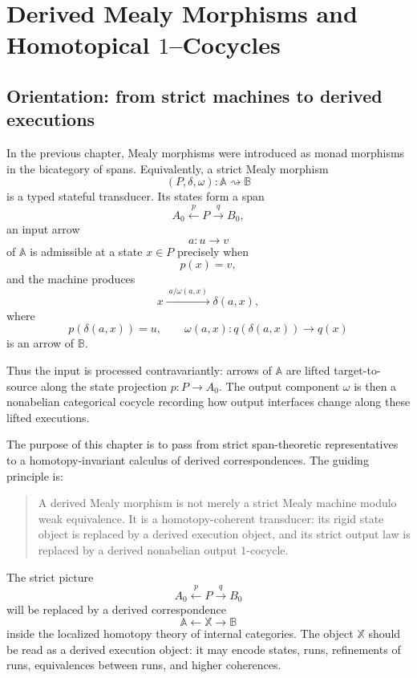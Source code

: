 \chapter{\texorpdfstring{Derived Mealy Morphisms and Homotopical $1$--Cocycles}{Derived Mealy Morphisms and Homotopical 1-Cocycles}}
\label{ch:derived-mealy-morphisms}

\section{Orientation: from strict machines to derived executions}
\label{sec:derived-mealy-orientation}

In the previous chapter, Mealy morphisms were introduced as monad
morphisms in the bicategory of spans. Equivalently, a strict Mealy
morphism
\[
(P,\delta,\omega):\mathbb A\rightsquigarrow \mathbb B
\]
is a typed stateful transducer. Its states form a span
\[
A_0 \xleftarrow{p} P \xrightarrow{q} B_0,
\]
an input arrow
\[
a:u\to v
\]
of \(\mathbb A\) is admissible at a state \(x\in P\) precisely when
\[
p(x)=v,
\]
and the machine produces
\[
x
\xrightarrow{\;a/\omega(a,x)\;}
\delta(a,x),
\]
where
\[
p(\delta(a,x))=u,
\qquad
\omega(a,x):q(\delta(a,x))\to q(x)
\]
is an arrow of \(\mathbb B\).

Thus the input is processed contravariantly: arrows of \(\mathbb A\) are
lifted target-to-source along the state projection \(p:P\to A_0\). The
output component \(\omega\) is then a nonabelian categorical cocycle
recording how output interfaces change along these lifted executions.

The purpose of this chapter is to pass from strict span-theoretic
representatives to a homotopy-invariant calculus of derived
correspondences. The guiding principle is:

\begin{quote}
A derived Mealy morphism is not merely a strict Mealy machine modulo
weak equivalence. It is a homotopy-coherent transducer: its rigid state
object is replaced by a derived execution object, and its strict output
law is replaced by a derived nonabelian output \(1\)-cocycle.
\end{quote}

The strict picture
\[
A_0 \xleftarrow{p} P \xrightarrow{q} B_0
\]
will be replaced by a derived correspondence
\[
\mathbb A
\longleftarrow
\mathbb X
\longrightarrow
\mathbb B
\]
inside the localized homotopy theory of internal categories. The object
\(\mathbb X\) should be read as a derived execution object: it may encode
states, runs, refinements of runs, equivalences between runs, and higher
coherences.

